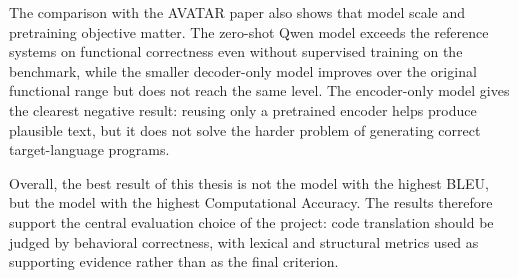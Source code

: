 The comparison with the AVATAR paper also shows that model scale and pretraining
objective matter. The zero-shot Qwen model exceeds the reference systems on
functional correctness even without supervised training on the benchmark, while
the smaller decoder-only model improves over the original functional range but
does not reach the same level. The encoder-only model gives the clearest
negative result: reusing only a pretrained encoder helps produce plausible text,
but it does not solve the harder problem of generating correct target-language
programs.

Overall, the best result of this thesis is not the model with the highest BLEU,
but the model with the highest Computational Accuracy. The results therefore
support the central evaluation choice of the project: code translation should
be judged by behavioral correctness, with lexical and structural metrics used
as supporting evidence rather than as the final criterion.
